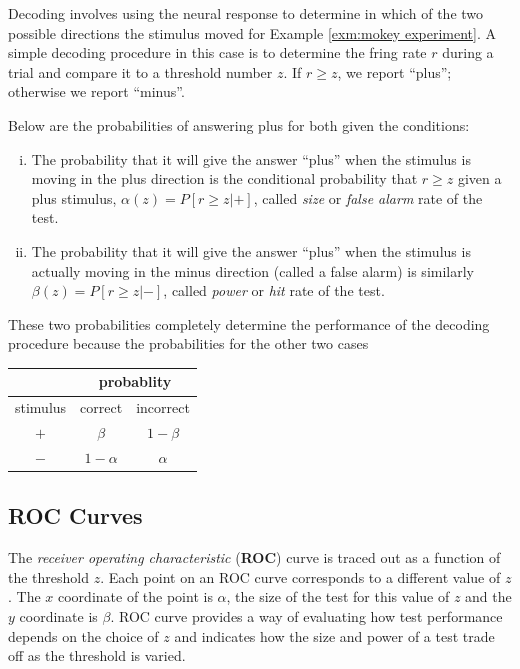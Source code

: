 \begin{rem}
 
Decoding involves using the neural
response to determine in which of the two possible directions the
stimulus moved for Example \ref{exm:mokey experiment}. A simple decoding procedure in this case is to determine the fring rate
$r$ during a trial and compare it to a threshold number $z$. If $r
\geq z$, we report “plus”; otherwise we report “minus”.
\end{rem}

\begin{defn}
  \label{defn:size and power}
    Below are the probabilities of answering plus for both given the conditions:
  \begin{enumerate}[(i)]
  \item The probability that it will give the answer “plus”
when the stimulus is moving in the plus direction is the conditional probability that $r\geq z$ given a plus
stimulus, $\alpha(z)=P[r\geq z|+]$, called \emph{size} or \emph{false
  alarm} rate of the test.
\item The probability that it will give the answer “plus”
when the stimulus is actually moving in the minus direction (called a false
alarm) is similarly $\beta(z)=P[r\geq z|-]$, called \emph{power} or \emph{hit} rate of the test.
\end{enumerate}

These two probabilities completely determine the performance of the decoding procedure because the probabilities for the other two cases
\begin{center}
  \begin{tabular}[h]{|c|cc|}
\hline
         & \multicolumn{2}{c|}{probablity}          \\ \hline
stimulus & \multicolumn{1}{c|}{correct} & incorrect \\ \hline
$+$        & \multicolumn{1}{c|}{$\beta$}        &$1-\beta$       \\ \hline
$-$       & \multicolumn{1}{c|}{$1-\alpha$}     & $\alpha$         \\ \hline
\end{tabular}
\end{center}
\end{defn}


\subsection{ROC Curves}
\begin{defn}
  \label{def:ROC curves}
  The \emph{receiver operating characteristic} (\textbf{ROC}) curve is
  traced out as a function of the threshold $z$. Each point on an ROC
  curve corresponds to a different value of $z$. The $x$ coordinate of
  the point is $\alpha$, the size of the test for this value of $z$
 and the $y$ coordinate is $\beta$. ROC curve provides a way of
 evaluating how test performance depends on the choice of  $z$ and
 indicates how the size and power of a test trade off as the threshold
 is varied.
\end{defn}

